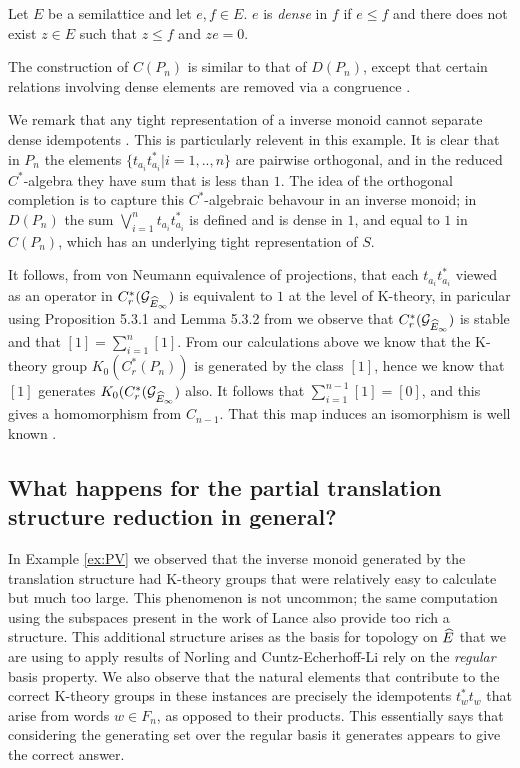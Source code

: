 \begin{example}
\begin{example}
\begin{definition}
Let $E$ be a semilattice and let $e,f \in E$. $e$ is \textit{dense} in $f$ if $e \leq f$ and there does not exist $z \in E$ such that $z \leq f$ and $ze=0$. 
\end{definition}

The construction of $C(P_{n})$ is similar to that of $D(P_{n})$, except that certain relations involving dense elements are removed via a congruence \cite{lawson-2011-1}.

We remark that any tight representation of a inverse monoid cannot separate dense idempotents \cite{MR2419901}. This is particularly relevent in this example. It is clear that in $P_{n}$ the elements $\lbrace t_{a_{i}}t_{a_{i}}^{*} | i = 1,..,n \rbrace$ are pairwise orthogonal, and in the reduced $C^{*}$-algebra they have sum that is less than $1$. The idea of the orthogonal completion is to capture this $C^{*}$-algebraic behavour in an inverse monoid; in $D(P_{n})$ the sum $\bigvee_{i=1}^{n} t_{a_{i}}t_{a_{i}}^{*}$ is defined and is dense in $1$, and equal to $1$ in $C(P_{n})$, which has an underlying tight representation of $S$. 

It follows, from von Neumann equivalence of projections, that each $t_{a_{i}}t_{a_{i}}^{*}$ viewed as an operator in $C^{*}_{r}(\mathcal{G}_{\widehat{E}_{\infty}})$ is equivalent to $1$ at the level of K-theory, in paricular using Proposition 5.3.1 and Lemma 5.3.2 from \cite{MR1222415} we observe that $C^{*}_{r}(\mathcal{G}_{\widehat{E}_{\infty}})$ is stable and that $[1]=\sum_{i=1}^{n}[1]$. From our calculations above we know that the K-theory group $K_{0}(C^{*}_{r}(P_{n}))$ is generated by the class $[1]$, hence we know that $[1]$ generates $K_{0}(C^{*}_{r}(\mathcal{G}_{\widehat{E}_{\infty}})$ also. It follows that $\sum_{i=1}^{n-1}[1]=[0]$, and this gives a homomorphism from $C_{n-1}$. That this map induces an isomorphism is well known \cite{MR2457037}. 

\end{example}

\subsection{What happens for the partial translation structure reduction in general?}

In Example \ref{ex:PV} we observed that the inverse monoid generated by the translation structure had K-theory groups that were relatively easy to calculate but much too large. This phenomenon is not uncommon; the same computation using the subspaces present in the work of Lance \cite{MR723010} also provide too rich a structure. This additional structure arises as the basis for topology on $\widehat{E}$ that we are using to apply results of Norling and Cuntz-Echerhoff-Li rely on the \textit{regular} basis property. We also observe that the natural elements that contribute to the correct K-theory groups in these instances are precisely the idempotents $t_{w}^{*}t_{w}$ that arise from words $w \in F_{n}$, as opposed to their products. This essentially says that considering the generating set over the regular basis it generates appears to give the correct answer.


\end{example}
